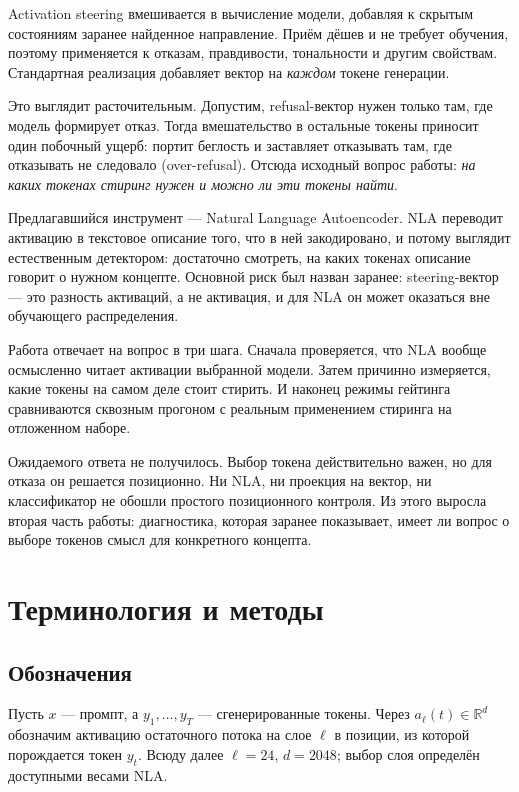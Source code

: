 \documentclass[11pt,a4paper]{article}
\begin{document}
Activation steering вмешивается в вычисление модели, добавляя к скрытым
состояниям заранее найденное направление. Приём дёшев и не требует обучения,
поэтому применяется к отказам, правдивости, тональности и другим свойствам.
Стандартная реализация добавляет вектор на \emph{каждом} токене генерации.

Это выглядит расточительным. Допустим, refusal-вектор нужен только там, где
модель формирует отказ. Тогда вмешательство в остальные токены приносит один
побочный ущерб: портит беглость и заставляет отказывать там, где отказывать не
следовало (over-refusal). Отсюда исходный вопрос работы: \emph{на каких токенах
стиринг нужен и можно ли эти токены найти}.

Предлагавшийся инструмент --- Natural Language Autoencoder. NLA переводит
активацию в текстовое описание того, что в ней закодировано, и потому выглядит
естественным детектором: достаточно смотреть, на каких токенах описание говорит
о нужном концепте. Основной риск был назван заранее: steering-вектор --- это
разность активаций, а не активация, и для NLA он может оказаться вне обучающего
распределения.

Работа отвечает на вопрос в три шага. Сначала проверяется, что NLA вообще
осмысленно читает активации выбранной модели. Затем причинно измеряется, какие
токены на самом деле стоит стирить. И наконец режимы гейтинга сравниваются
сквозным прогоном с реальным применением стиринга на отложенном наборе.

Ожидаемого ответа не получилось. Выбор токена действительно важен, но для
отказа он решается позиционно. Ни NLA, ни проекция на вектор, ни классификатор не
обошли простого позиционного контроля. Из этого выросла вторая часть работы:
диагностика, которая заранее показывает, имеет ли вопрос о выборе токенов смысл
для конкретного концепта.

\section{Терминология и методы}

\subsection{Обозначения}

Пусть $x$ --- промпт, а $y_1,\dots,y_T$ --- сгенерированные токены. Через
$a_\ell(t)\in\mathbb{R}^d$ обозначим активацию остаточного потока на слое $\ell$
в позиции, из которой порождается токен $y_t$. Всюду далее $\ell=24$,
$d=2048$; выбор слоя определён доступными весами NLA.
\end{document}
